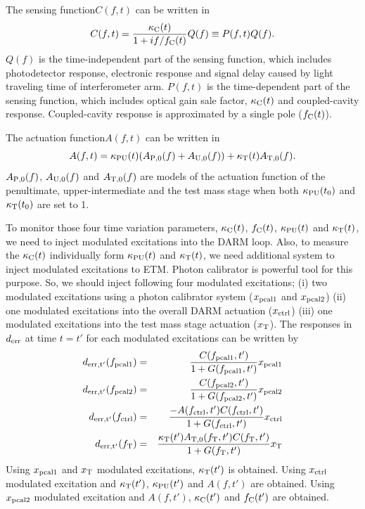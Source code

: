The sensing function$C(f,t)$ can be written in
\begin{equation}
C(f,t) = \frac{\kappa_{\rm C}(t)}{1+if/f_{\rm C}(t)}Q(f) \equiv P(f,t) Q(f).
\end{equation}
$Q(f)$ is the time-independent part of the sensing function, which includes
photodetector response,
electronic response
and signal delay caused by light traveling time of interferometer arm.
$P(f,t)$ is the time-dependent part of the sensing function, which includes
optical gain sale factor, $\kappa_{\rm C}(t)$ and coupled-cavity response.
Coupled-cavity response is approximated by a single pole ($f_{\rm C}(t)$).

The actuation function$A(f,t)$ can be written in
\begin{equation}
A(f,t) = \kappa_{\rm PU}(t)(A_{\rm P,0}(f)+A_{\rm U,0}(f)) + \kappa_{\rm T}(t) A_{\rm T,0}(f).
\end{equation}
$A_{\rm P,0}(f)$, $A_{\rm U,0}(f)$ and $A_{\rm T,0}(f)$ are models of the actuation function 
of the penultimate, upper-intermediate and the test mass stage 
when both $\kappa_{\rm PU}(t_0)$ and $\kappa_{\rm T}(t_0)$ are set to 1.

To monitor those four time variation parameters, 
$\kappa_{\rm C}(t)$, $f_{\rm C}(t)$, $\kappa_{\rm PU}(t)$ and $\kappa_{\rm T}(t)$, 
we need to inject modulated excitations into the DARM loop.
Also, to measure the $\kappa_{\rm C}(t)$ individually form $\kappa_{\rm PU}(t)$ and $\kappa_{\rm T}(t)$,
we need additional system to inject modulated excitations to ETM.
Photon calibrator is powerful tool for this purpose.
So, we should inject following four modulated excitations;
(i) two modulated excitations using a photon calibrator system ($x_{\rm pcal1}$ and $x_{\rm pcal2}$)
(ii) one modulated excitations into the overall DARM actuation ($x_{\rm ctrl}$)
(iii) one modulated excitations into the test mass stage actuation ($x_{\rm T}$).
The responses in $d_{\rm err}$ at time $t=t'$ for each modulated excitations can be written by
\begin{eqnarray}
d_{\rm err, t'}(f_{\rm pcal1}) &=& \frac{C(f_{\rm pcal1},t')}{1+G(f_{\rm pcal1},t')} x_{\rm pcal1} \\
d_{\rm err, t'}(f_{\rm pcal2}) &=& \frac{C(f_{\rm pcal2},t')}{1+G(f_{\rm pcal2},t')} x_{\rm pcal2} \\
d_{\rm err, t'}(f_{\rm ctrl}) &=& \frac{-A(f_{\rm ctrl}, t')C(f_{\rm ctrl},t')}{1+G(f_{\rm ctrl},t')} x_{\rm ctrl}  \\
d_{\rm err, t'}(f_{\rm T}) &=& \frac{\kappa_{\rm T}(t') A_{\rm T,0}(f_{\rm T}, t')C(f_{\rm T},t')}{1+G(f_{\rm T},t')} x_{\rm T} 
\end{eqnarray}
Using $x_{\rm pcal1}$ and $x_{\rm T}$ modulated excitations, $\kappa_{\rm T}(t')$ is obtained.
Using $x_{\rm ctrl}$ modulated excitation and $\kappa_{\rm T}(t')$, $\kappa_{\rm PU}(t')$ and $A(f,t')$ are obtained. 
Using $x_{\rm pcal2}$ modulated excitation and $A(f,t')$, $\kappa_{\rm C}(t')$ and $f_{\rm C}(t')$ are obtained.


